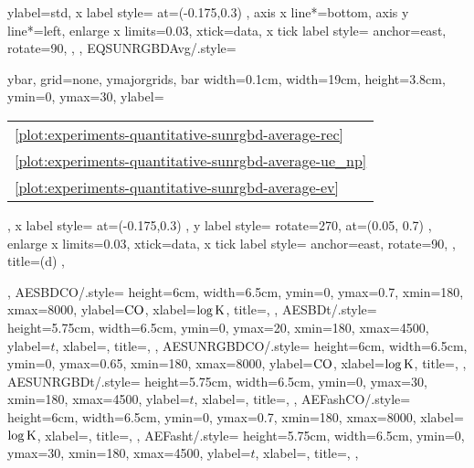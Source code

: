 {{		ylabel=std,
		x label style={
            at={(-0.175,0.3)}
        },
		axis x line*=bottom,
        axis y line*=left,
		enlarge x limits=0.03,
		xtick=data,
		x tick label style={
			anchor=east,
			rotate=90,
		},
    },
    EQSUNRGBDAvg/.style={
        ybar,
        grid=none,
        ymajorgrids,
		bar width=0.1cm,
		width=19cm,
		height=3.8cm,
		ymin=0,
		ymax=30,
		ylabel=\begin{tabular}{l}\ref{plot:experiments-quantitative-sunrgbd-average-rec} \ARec\\\ref{plot:experiments-quantitative-sunrgbd-average-ue_np} \AUE\\\ref{plot:experiments-quantitative-sunrgbd-average-ev} \AEV\end{tabular},
		x label style={
            at={(-0.175,0.3)}
        },
        y label style={
        		rotate=270,
        		at={(0.05, 0.7)}
        },
		enlarge x limits=0.03,
		xtick=data,
		x tick label style={
			anchor=east,
			rotate=90,
		},
		title=(d) \SUNRGBD,
    },
    AESBDCO/.style={
        height=6cm,
        width=6.5cm,
        ymin=0,
        ymax=0.7,
        xmin=180,
        xmax=8000,
        ylabel=$\text{CO}$,
        xlabel=$\log\text{K}$,
        title=\SBD,
    },
    AESBDt/.style={
        height=5.75cm,
        width=6.5cm,
        ymin=0,
        ymax=20,
        xmin=180,
        xmax=4500,
        ylabel=$t$,
        xlabel=\K,
        title=\SBD,
    },
    AESUNRGBDCO/.style={
        height=6cm,
        width=6.5cm,
        ymin=0,
        ymax=0.65,
        xmin=180,
        xmax=8000,
        ylabel=$\text{CO}$,
        xlabel=$\log\text{K}$,
        title=\SUNRGBD,
    },
    AESUNRGBDt/.style={
        height=5.75cm,
        width=6.5cm,
        ymin=0,
        ymax=30,
        xmin=180,
        xmax=4500,
        ylabel=$t$,
        xlabel=\K,
        title=\SUNRGBD,
    },
    AEFashCO/.style={
        height=6cm,
        width=6.5cm,
        ymin=0,
        ymax=0.7,
        xmin=180,
        xmax=8000,
        xlabel=$\log\text{K}$,
        xlabel=\K,
        title=\Fash,
    },
    AEFasht/.style={
        height=5.75cm,
        width=6.5cm,
        ymin=0,
        ymax=30,
        xmin=180,
        xmax=4500,
        ylabel=$t$,
        xlabel=\K,
        title=\Fash,
    },
}
